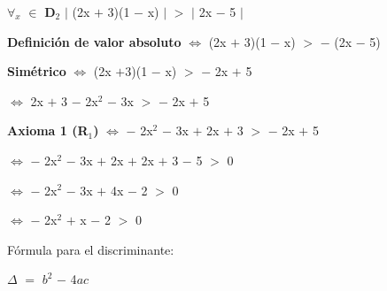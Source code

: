\documentclass[12pt]{article}
\begin{document}
\hspace{4.5cm} $\forall$$_{x}$ $\in$  {\bfseries{{\textcolor{Burnt Sienna}{\mbox{D$_{2}$}}}}} \hspace{0.5cm} $\mid$ (2x $+$ 3)(1 $-$ x) $\mid$ $>$ $\mid$ 2x $-$ 5 $\mid$ \vspace{0.5cm}

{\bfseries{Definición de valor absoluto}} \hspace{0.1cm} $\Longleftrightarrow$ \hspace{0.2cm} (2x $+$ 3)(1 $-$ x) $>$ $-$ (2x $-$ 5) \vspace{0.5cm}

\hspace{3cm} {\bfseries{Simétrico}} \hspace{.5cm} $\Longleftrightarrow$ \hspace{0.2cm} (2x $+ $3)(1 $-$ x) $>$ $-$ 2x $+$ 5 \vspace{0.5cm}

\hspace{5.6cm} $\Longleftrightarrow$ \hspace{0.2cm} 2x $+$ 3 $-$ 2x$^{2}$ $-$ 3x $>$ $-$ 2x $+$ 5 \vspace{0.5cm}

\hspace{2cm} {\bfseries{{\textcolor{carrotorange}{Axioma 1 (R$_{1}$)}}}} \hspace{.5cm} $\Longleftrightarrow$ \hspace{0.2cm} $-$ 2x$^{2}$ $-$ 3x $+$ 2x $+$ 3  $>$ $-$ 2x $+$ 5 \vspace{0.5cm}

\hspace{5.6cm} $\Longleftrightarrow$ \hspace{0.2cm} $-$ 2x$^{2}$ $-$ 3x $+$ 2x $+$ 2x $+$ 3 $-$ 5 $>$ $0$ \vspace{0.5cm}

\hspace{5.6cm} $\Longleftrightarrow$ \hspace{0.2cm} $-$ 2x$^{2}$ $-$ 3x $+$ 4x $-$ 2 $>$ $0$ \vspace{0.5cm}

\hspace{5.6cm} $\Longleftrightarrow$ \hspace{0.2cm} $-$ 2x$^{2}$ $+$ x $-$ 2 $>$ $0$ \vspace{0.5cm}

Fórmula para el discriminante:\vspace{0.5cm}

$\Delta$ $=$ $b^{2}$ $-$ 4$a$$c$ \vspace{0.2cm}
\end{document}
